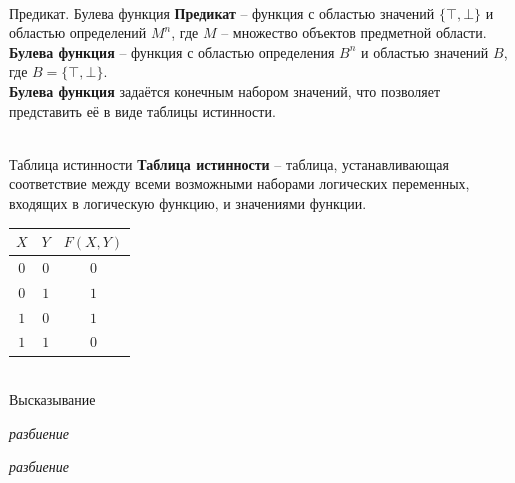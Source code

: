 \begin{frame}{\\Предикат. Булева функция}
	\topline
	\textbf{Предикат} -- функция с областью значений $\{\top, \bot\}$ и областью определений $M^n$, где $M$ -- множество объектов предметной области.\\
	\textbf{Булева функция} -- функция с областью определения $B^n$ и областью значений $B$, где $B = \{\top, \bot\}$.\\
	\textbf{Булева функция} задаётся конечным набором значений, что позволяет представить её в виде таблицы истинности.
\end{frame}

\begin{frame}{\\Таблица истинности}
	\topline
	\justifying
	\textbf{Таблица истинности} -- таблица, устанавливающая соответствие между всеми возможными наборами логических переменных, входящих в логическую функцию, и значениями функции.\\
	\vspace{5mm}
	\begin{center}
		\begin{tabular}{|c|c|c|}
			\hline
			$X$ & $Y$ & $F(X,Y)$\\
			\hline
			$0$ & $0$ & $0$\\
			\hline
			$0$ & $1$ & $1$\\
			\hline
			$1$ & $0$ & $1$\\
			\hline
			$1$ & $1$ & $0$\\
			\hline
		\end{tabular}
	\end{center}
\end{frame}

\begin{frame}{\\Высказывание}
	\topline
	\justifying
	\begin{SCn}
		\begin{scnreltoset}{\textit{разбиение}}
		\end{scnreltoset}
		\begin{scnreltoset}{\textit{разбиение}}
		\end{scnreltoset}
	\end{SCn}
\end{frame}

